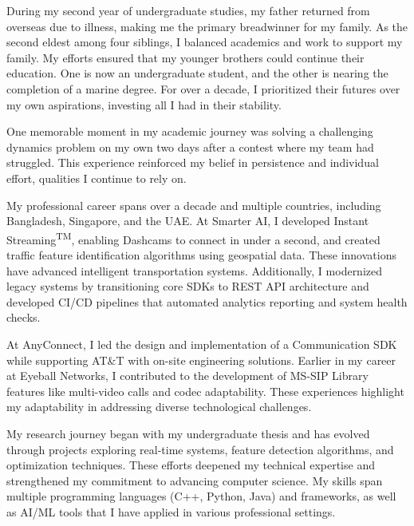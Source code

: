\documentclass[11pt]{article}
\newif\ifshowsections
\begin{document}
During my second year of undergraduate studies, my father returned from overseas due to illness, making me the primary breadwinner for my family. As the second eldest among four siblings, I balanced academics and work to support my family. My efforts ensured that my younger brothers could continue their education. One is now an undergraduate student, and the other is nearing the completion of a marine degree. For over a decade, I prioritized their futures over my own aspirations, investing all I had in their stability.


One memorable moment in my academic journey was solving a challenging dynamics problem on my own two days after a contest where my team had struggled. This experience reinforced my belief in persistence and individual effort, qualities I continue to rely on.


\ifshowsections\section*{Professional Experience}\fi


My professional career spans over a decade and multiple countries, including Bangladesh, Singapore, and the UAE. At Smarter AI, I developed Instant Streaming\textsuperscript{TM}, enabling Dashcams to connect in under a second, and created traffic feature identification algorithms using geospatial data. These innovations have advanced intelligent transportation systems. Additionally, I modernized legacy systems by transitioning core SDKs to REST API architecture and developed CI/CD pipelines that automated analytics reporting and system health checks.


At AnyConnect, I led the design and implementation of a Communication SDK while supporting AT&T with on-site engineering solutions. Earlier in my career at Eyeball Networks, I contributed to the development of MS-SIP Library features like multi-video calls and codec adaptability. These experiences highlight my adaptability in addressing diverse technological challenges.


\ifshowsections\section*{Research Interests}\fi


My research journey began with my undergraduate thesis and has evolved through projects exploring real-time systems, feature detection algorithms, and optimization techniques. These efforts deepened my technical expertise and strengthened my commitment to advancing computer science. My skills span multiple programming languages (C++, Python, Java) and frameworks, as well as AI/ML tools that I have applied in various professional settings.
\end{document}
